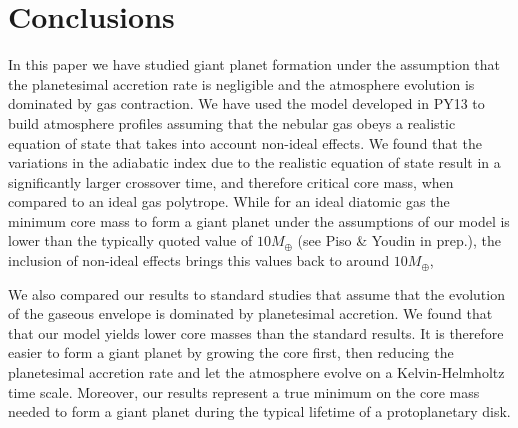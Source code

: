 \documentclass[apj]{emulateapj}
\begin{document}
 \section{Conclusions}
 \label{conclusions}
 
 In this paper we have studied giant planet formation under the assumption that the planetesimal accretion rate is negligible and the atmosphere evolution is dominated by gas contraction. We have used the model developed in PY13 to build atmosphere profiles assuming that the nebular gas obeys a realistic equation of state that takes into account non-ideal effects. We found that the variations in the adiabatic index due to the realistic equation of state result in a significantly larger crossover time, and therefore critical core mass, when compared to an ideal gas polytrope. While for an ideal diatomic gas the minimum core mass to form a giant planet under the assumptions of our model is lower than the typically quoted value of $10 M_{\oplus}$ (see Piso \& Youdin in prep.), the inclusion of non-ideal effects brings this values back to around $10 M_{\oplus}$,
 
 We also compared our results to standard studies that assume that the evolution of the gaseous envelope is dominated by planetesimal accretion. We found that that our model yields lower core masses than the standard results. It is therefore easier to form a giant planet by growing the core first, then reducing the planetesimal accretion rate and let the atmosphere evolve on a Kelvin-Helmholtz time scale. Moreover, our results represent a true minimum on the core mass needed to form a giant planet during the typical lifetime of a protoplanetary disk.
 
\end{document}
